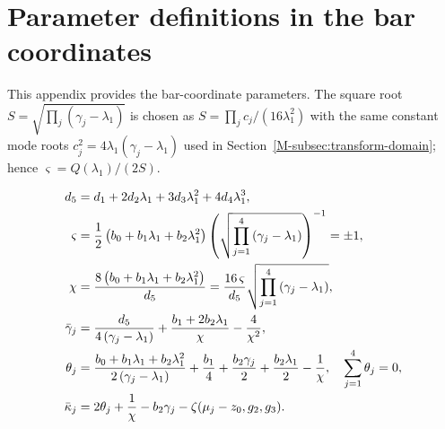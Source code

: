 \documentclass[11pt,a4paper]{article}
\begin{document}

\section{Parameter definitions in the bar coordinates}
\label{app:bar-coords-params}

This appendix provides the bar-coordinate parameters.
The square root $S=\sqrt{\prod_j(\gamma_j-\lambda_1)}$ is chosen as $S=\prod_j c_j/(16\lambda_1^2)$ with the same constant mode roots $c_j^2=4\lambda_1(\gamma_j-\lambda_1)$ used in Section~\ref*{M-subsec:transform-domain}; hence $\varsigma=Q(\lambda_1)/(2S)$.

\begin{align}
{d}_{5} &= {d}_{1} + 2 {d}_{2} {\lambda}_{1} + 3 {d}_{3} {\lambda}_{1}^{2} + 4 {d}_{4} {\lambda}_{1}^{3}, \notag  \\
\varsigma & = \frac{1}{2} \left(b_0 + b_1 {\lambda}_{1} + b_2{\lambda}_{1}^2\right) \left(\sqrt{\prod\limits_{j=1}^4 \left(\gamma_j - \lambda_1\right)}\right)^{-1}  = \pm 1, \\
\chi &= \frac{8\left(b_0 + b_1 {\lambda}_{1} + b_2{\lambda}_{1}^2\right)}{d_5} = \frac{16\, \varsigma}{d_5}\sqrt{\prod\limits_{j=1}^4 \left(\gamma_j - \lambda_1\right)}, \notag \\
\bar{\gamma}_{j} &= \frac{{d}_{5}}{4 \left({\gamma}_{j} - {\lambda}_{1}\right)} + \frac{{b}_{1} + 2 {b}_{2} {\lambda}_{1}}{\chi} - \frac{4}{\chi^{2}}, \notag \\
{\theta}_{j} &= \frac{b_0 + b_1 {\lambda}_{1} + b_2{\lambda}_{1}^2}{2\left({\gamma}_{j} - {\lambda}_{1}\right)} + \frac{{b}_{1}}{4} + \frac{{b}_{2} {\gamma}_{j}}{2} + \frac{{b}_{2} {\lambda}_{1}}{2} - \frac{1}{\chi}, \quad \sum\limits_{j=1}^{4} \theta_j = 0, \notag \\
\bar{\kappa}_j &= 2 {\theta}_{j} + \frac{1}{\chi} - {b}_{2} {\gamma}_{j} - \zeta{\left({\mu}_{j} - z_{0}, g_2, g_3\right)}.
\end{align}

\end{document}
